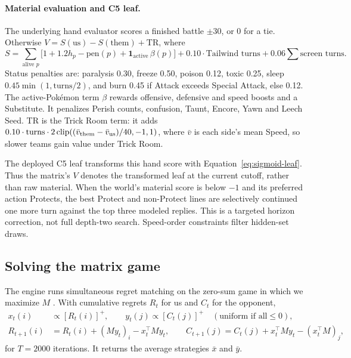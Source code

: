 \paragraph{Material evaluation and C5 leaf.} The underlying hand evaluator
scores a finished battle $\pm30$, or 0 for a tie. Otherwise
$V=S(\text{us})-S(\text{them})+\mathrm{TR}$, where
\begin{equation}
  S=\sum_{\text{alive }p}\big[1+1.2h_p-\mathrm{pen}(p)+\mathbf 1_{\text{active}}\,\beta(p)\big]
   +0.10\cdot\text{Tailwind turns}+0.06\sum\text{screen turns}.
\end{equation}
Status penalties are: paralysis 0.30, freeze 0.50, poison 0.12, toxic 0.25,
sleep $0.45\min(1,\text{turns}/2)$, and burn 0.45 if Attack exceeds Special
Attack, else 0.12. The active-Pok\'{e}mon term $\beta$ rewards offensive,
defensive and speed boosts and a Substitute. It penalizes Perish counts,
confusion, Taunt, Encore, Yawn and Leech Seed. TR is the Trick Room term: it
adds $0.10\cdot\text{turns}\cdot2\operatorname{clip}((\bar v_{\text{them}}-\bar v_{\text{us}})/40,-1,1)$,
where $\bar v$ is each side's mean Speed, so slower teams gain value under Trick Room.

The deployed C5 leaf transforms this hand score with
Equation~\eqref{eq:sigmoid-leaf}. Thus the matrix's $V$ denotes the transformed
leaf at the current cutoff, rather than raw material. When the world's
material score is below $-1$ and its preferred action Protects, the best
Protect and non-Protect lines are selectively continued one more turn against
the top three modeled replies. This is a targeted horizon correction, not
full depth-two search. Speed-order constraints filter hidden-set draws.

\subsection{Solving the matrix game}
The engine runs simultaneous regret matching on the zero-sum game in which we
maximize $M$ \citep{hartmascolell}. With cumulative regrets $R_t$ for us and
$C_t$ for the opponent,
\begin{align}
  x_t(i)&\propto[R_t(i)]^+,\qquad y_t(j)\propto[C_t(j)]^+\quad(\text{uniform if all}\le0),\\
  R_{t+1}(i)&=R_t(i)+(My_t)_i-x_t^\top My_t,\qquad
  C_{t+1}(j)=C_t(j)+x_t^\top My_t-(x_t^\top M)_j,
\end{align}
for $T=2000$ iterations. It returns the average strategies $\bar x$ and $\bar y$.

